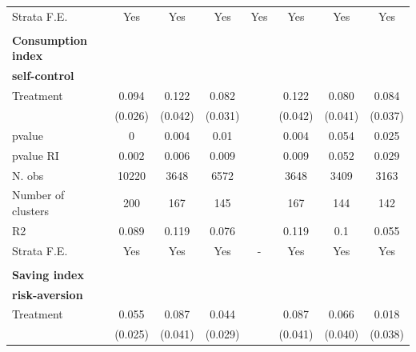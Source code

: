 \begin{table}[h!]
\begin{tabular}{lccccccc}
    Strata F.E. & Yes   & Yes   & Yes   & Yes   & Yes   & Yes   & Yes \\
          &       &       &       &       &       &       &  \\
    \midrule
    \textbf{Consumption index} &       &       &       &       &       &       &  \\
        \textbf{self-control} &       &       &       &       &       &       &  \\
 Treatment &   0.094 &   0.122 &   0.082 &            &   0.122 &     0.080 &    0.084 \\

           &    (0.026) &    (0.042) &    (0.031) &            &    (0.042) &    (0.041) &    (0.037) \\

    pvalue &          0 &      0.004 &       0.01 &            &      0.004 &      0.054 &      0.025 \\

 pvalue RI &      0.002 &      0.006 &      0.009 &            &      0.009 &      0.052 &      0.029 \\

    N. obs &      10220 &       3648 &       6572 &            &       3648 &       3409 &       3163 \\

Number of clusters &        200 &        167 &        145 &            &        167 &        144 &        142 \\

        R2 &      0.089 &      0.119 &      0.076 &            &      0.119 &        0.1 &      0.055 \\

    Strata F.E. & Yes   & Yes   & Yes   & -     & Yes   & Yes   & Yes \\
          &       &       &       &       &       &       &  \\
    \midrule
    \textbf{Saving index} &       &       &       &       &       &       &  \\
      \textbf{risk-aversion} &       &       &       &       &       &       &  \\

 Treatment &    0.055 &    0.087 &      0.044 &            &    0.087 &      0.066 &      0.018 \\

           &    (0.025) &    (0.041) &    (0.029) &            &    (0.041) &    (0.040) &    (0.038) \\


\end{tabular}
\end{table}
